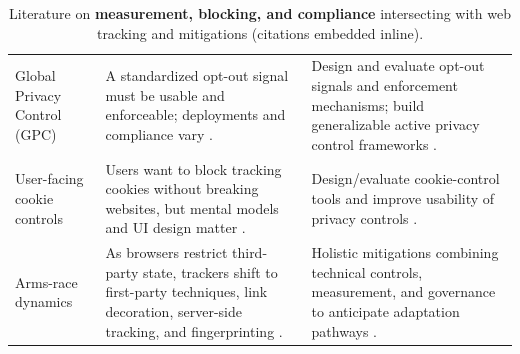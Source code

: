 \begin{table}[t]
\begin{tabularx}{\textwidth}{p{2.8cm} Y Y}
Global Privacy Control (GPC) &
A standardized opt-out signal must be usable and enforceable; deployments and compliance vary \cite{berjonGPCGDPR2021,zimmeckUsabilityEnforceabilityGlobal2023,zimmeckGlobalPrivacyControl2024}. &
Design and evaluate opt-out signals and enforcement mechanisms; build generalizable active privacy control frameworks \cite{zimmeckGeneralizableActivePrivacy2024,zimmeckUsabilityEnforceabilityGlobal2023,zimmeckGlobalPrivacyControl2024}. \\

User-facing cookie controls &
Users want to block tracking cookies without breaking websites, but mental models and UI design matter \cite{schoniBlockCookiesNot2024}. &
Design/evaluate cookie-control tools and improve usability of privacy controls \cite{schoniBlockCookiesNot2024}. \\

Arms-race dynamics &
As browsers restrict third-party state, trackers shift to first-party techniques, link decoration, server-side tracking, and fingerprinting \cite{narayanan2018web,callahanCanWeBetter2021}. &
Holistic mitigations combining technical controls, measurement, and governance to anticipate adaptation pathways \cite{callahanCanWeBetter2021,narayanan2018web}. \\

\bottomrule
\end{tabularx}
\caption{Literature on \textbf{measurement, blocking, and compliance} intersecting with web tracking and mitigations (citations embedded inline).}
\label{tab:appendix-mitigation-literature}
\end{table}